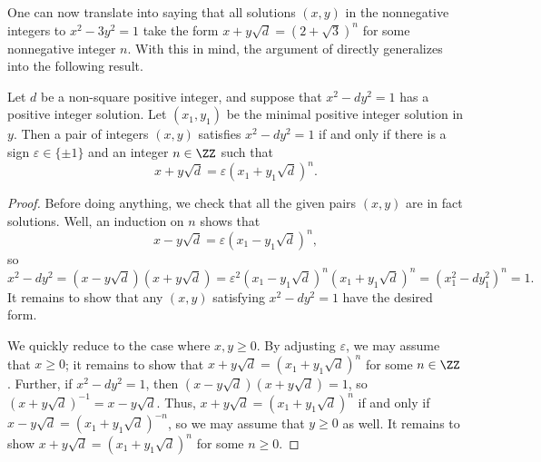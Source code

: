 \documentclass[../notes.tex]{subfiles}
\begin{document}
One can now translate  into saying that all solutions $(x,y)$ in the nonnegative integers to $x^2-3y^2=1$ take the form $x+y\sqrt d=\left(2+\sqrt3\right)^n$ for some nonnegative integer $n$. With this in mind, the argument of  directly generalizes into the following result.
\begin{proposition} \label{prop:solve-pell-norm-one}
	Let $d$ be a non-square positive integer, and suppose that $x^2-dy^2=1$ has a positive integer solution. Let $(x_1,y_1)$ be the minimal positive integer solution in $y$. Then a pair of integers $(x,y)$ satisfies $x^2-dy^2=1$ if and only if there is a sign $\varepsilon\in\{\pm1\}$ and an integer $n\in\ZZ$ such that
	\[x+y\sqrt d=\varepsilon\left(x_1+y_1\sqrt d\right)^n.\]
\end{proposition}
\begin{proof}
	Before doing anything, we check that all the given pairs $(x,y)$ are in fact solutions. Well, an induction on $n$ shows that
	\[x-y\sqrt d=\varepsilon\left(x_1-y_1\sqrt d\right)^n,\]
	so
	\[x^2-dy^2=\left(x-y\sqrt d\right)\left(x+y\sqrt d\right)=\varepsilon^2\left(x_1-y_1\sqrt d\right)^n\left(x_1+y_1\sqrt d\right)^n=\left(x_1^2-dy_1^2\right)^n=1.\]
	It remains to show that any $(x,y)$ satisfying $x^2-dy^2=1$ have the desired form.

	We quickly reduce to the case where $x,y\ge0$. By adjusting $\varepsilon$, we may assume that $x\ge0$; it remains to show that $x+y\sqrt d=\left(x_1+y_1\sqrt d\right)^n$ for some $n\in\ZZ$. Further, if $x^2-dy^2=1$, then $\left(x-y\sqrt d\right)\left(x+y\sqrt d\right)=1$, so $\left(x+y\sqrt d\right)^{-1}=x-y\sqrt d$. Thus, $x+y\sqrt d=\left(x_1+y_1\sqrt d\right)^n$ if and only if $x-y\sqrt d=\left(x_1+y_1\sqrt d\right)^{-n}$, so we may assume that $y\ge0$ as well. It remains to show $x+y\sqrt d=\left(x_1+y_1\sqrt d\right)^n$ for some $n\ge0$.


\end{proof}
\end{document}
